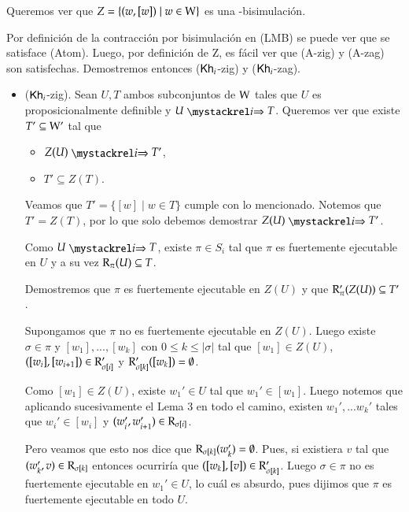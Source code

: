 \begin{demostracion}
    Queremos ver que $Z = \{(w,[w]) \mid w \in \mathrm{W}\}$ es una \KHilogic-bisimulación.
    
    Por definición de la contracción por bisimulación en (LMB) se puede ver que se satisface (Atom). Luego, por definición de Z, es fácil ver que (A-zig) y (A-zag) son satisfechas. Demostremos entonces ($\mathsf{Kh}_i$-zig) y ($\mathsf{Kh}_i$-zag).

    \begin{itemize}
        \item ($\mathsf{Kh}_i$-zig). Sean $U, T$ ambos subconjuntos de $\mathrm{W}$ tales que $U$ es proposicionalmente definible y $U \ultsExecAgi T$. Queremos ver que existe $T' \subseteq \mathrm{W}'$ tal que

        \begin{multicols}{2}
            \begin{itemize}
                \item $Z(U) \ultsExecAgi T'$, 
                \item $T' \subseteq Z(T)$.
            \end{itemize}
        \end{multicols}
        Veamos que $T' = \{[w] \mid w \in T\}$ cumple con lo mencionado. Notemos que $T' = Z(T)$, por lo que solo debemos demostrar $Z(U) \ultsExecAgi T'$.

        Como $U \ultsExecAgi T$, existe $\pi \in S_i$ tal que $\pi$ es fuertemente ejecutable en $U$ y a su vez $\mathrm{R}_\pi(U) \subseteq T$.

        Demostremos que $\pi$ es fuertemente ejecutable en $Z(U)$ y que $\mathrm{R}'_\pi(Z(U)) \subseteq T'$.

        Supongamos que $\pi$ no es fuertemente ejecutable en $Z(U)$. Luego existe $\sigma \in \pi$ y $[w_1],...,[w_k]$ con $0 \le k \le |\sigma|$ tal que $[w_1] \in Z(U)$, $([w_i], [w_{i+1}]) \in \mathrm{R}'_{\sigma[i]}$ y $\mathrm{R}'_{\sigma[k]}([w_k]) = \emptyset$.

        Como $[w_1] \in Z(U)$, existe $w_1' \in U$ tal que $w_1' \in [w_1]$. Luego notemos que aplicando sucesivamente el Lema 3 en todo el camino, existen $w_1',...w_k'$ tales que $w_i' \in [w_i]$ y $(w_i',w_{i+1}') \in \mathrm{R}_{\sigma[i]}$.

        Pero veamos que esto nos dice que $\mathrm{R}_{\sigma[k]}(w_k') = \emptyset$. Pues, si existiera $v$ tal que $(w_k',v) \in \mathrm{R}_{\sigma[k]}$ entonces ocurriría que $([w_k],[v]) \in \mathrm{R}'_{\sigma[k]}$. Luego $\sigma \in \pi$ no es fuertemente ejecutable en $w_1' \in U$, lo cuál es absurdo, pues dijimos que $\pi$ es fuertemente ejecutable en todo $U$.


\end{itemize}
\end{demostracion}
